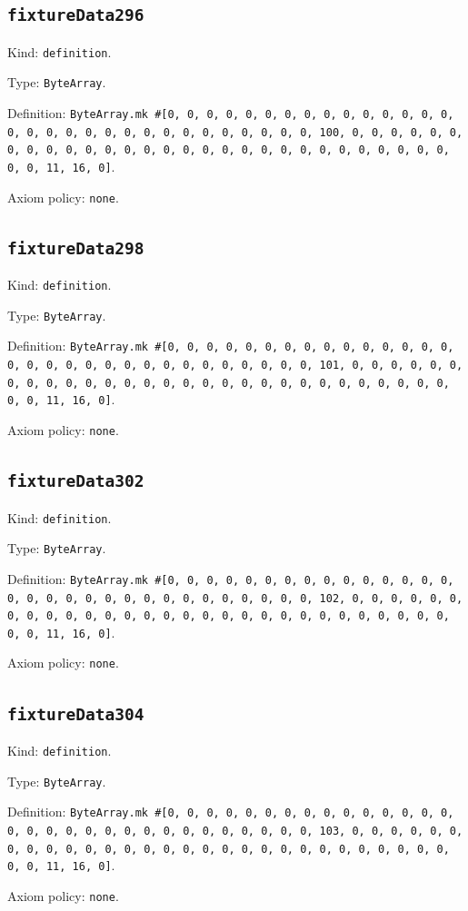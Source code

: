 \documentclass[11pt]{article}
\begin{document}
\subsection*{\texttt{fixtureData296}}
\noindent Kind: \texttt{definition}.\par
\noindent Type: \texttt{ByteArray}.\par
\noindent Definition: \texttt{ByteArray.mk \#[0, 0, 0, 0, 0, 0, 0, 0, 0, 0, 0, 0, 0, 0, 0, 0, 0, 0, 0, 0, 0, 0, 0, 0, 0, 0, 0, 0, 0, 0, 0, 100, 0, 0, 0, 0, 0, 0, 0, 0, 0, 0, 0, 0, 0, 0, 0, 0, 0, 0, 0, 0, 0, 0, 0, 0, 0, 0, 0, 0, 0, 0, 0, 11, 16, 0]}.\par
\noindent Axiom policy: \texttt{none}.\par
\subsection*{\texttt{fixtureData298}}
\noindent Kind: \texttt{definition}.\par
\noindent Type: \texttt{ByteArray}.\par
\noindent Definition: \texttt{ByteArray.mk \#[0, 0, 0, 0, 0, 0, 0, 0, 0, 0, 0, 0, 0, 0, 0, 0, 0, 0, 0, 0, 0, 0, 0, 0, 0, 0, 0, 0, 0, 0, 0, 101, 0, 0, 0, 0, 0, 0, 0, 0, 0, 0, 0, 0, 0, 0, 0, 0, 0, 0, 0, 0, 0, 0, 0, 0, 0, 0, 0, 0, 0, 0, 0, 11, 16, 0]}.\par
\noindent Axiom policy: \texttt{none}.\par
\subsection*{\texttt{fixtureData302}}
\noindent Kind: \texttt{definition}.\par
\noindent Type: \texttt{ByteArray}.\par
\noindent Definition: \texttt{ByteArray.mk \#[0, 0, 0, 0, 0, 0, 0, 0, 0, 0, 0, 0, 0, 0, 0, 0, 0, 0, 0, 0, 0, 0, 0, 0, 0, 0, 0, 0, 0, 0, 0, 102, 0, 0, 0, 0, 0, 0, 0, 0, 0, 0, 0, 0, 0, 0, 0, 0, 0, 0, 0, 0, 0, 0, 0, 0, 0, 0, 0, 0, 0, 0, 0, 11, 16, 0]}.\par
\noindent Axiom policy: \texttt{none}.\par
\subsection*{\texttt{fixtureData304}}
\noindent Kind: \texttt{definition}.\par
\noindent Type: \texttt{ByteArray}.\par
\noindent Definition: \texttt{ByteArray.mk \#[0, 0, 0, 0, 0, 0, 0, 0, 0, 0, 0, 0, 0, 0, 0, 0, 0, 0, 0, 0, 0, 0, 0, 0, 0, 0, 0, 0, 0, 0, 0, 103, 0, 0, 0, 0, 0, 0, 0, 0, 0, 0, 0, 0, 0, 0, 0, 0, 0, 0, 0, 0, 0, 0, 0, 0, 0, 0, 0, 0, 0, 0, 0, 11, 16, 0]}.\par
\noindent Axiom policy: \texttt{none}.\par
\end{document}
